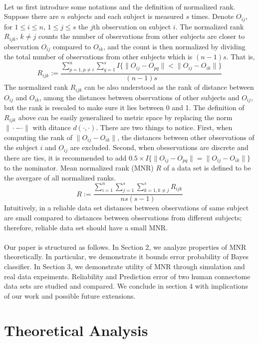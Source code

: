 \documentclass{article}
\begin{document}
\\
Let us first introduce some notations and the definition of normalized rank. Suppose there are $n$ subjects and each subject is measured $s$ times. Denote $O_{ij}$, for $1\leq i \leq n$, $1\leq j \leq s$ the $j$th observation on subject $i$. The normalized rank $R_{ijk}$, $k\neq j$ counts the number of observations from other subjects are closer to observation $O_{ij}$ compared to $O_{ik}$, and the count is then normalized by dividing the total number of observations from other subjects which is $(n-1)s$. That is,
\[R_{ijk} := \frac{\sum\limits_{p=1,p\neq i}^{n} \sum\limits_{q=1}^{s} I\{\|O_{ij}-O_{pq}\| < \|O_{ij}-O_{ik}\| \} }{(n-1)s}\]
 The normalized rank $R_{ijk}$ can be also understood as the rank of distance between $O_{ij}$ and $O_{ik}$, among the distances between observations of other subjects and $O_{ij}$, but the rank is rescaled to make sure it lies between 0 and 1. The definition of $R_{ijk}$ above can be easily generalized to metric space by replacing the norm $\|\cdot-\cdot\|$ with ditance $d(\cdot,\cdot)$. There are two things to notice. First, when computing the rank of $\|O_{ij}-O_{ik}\|$, the distances between other observations of the subject $i$ and $O_{ij}$ are excluded. Second, when obeservations are discrete and there are ties, it is recommended to add $0.5 \times I\{\|O_{ij}-O_{pq}\| = \|O_{ij}-O_{ik}\| \}$ to the nominator. Mean normalized rank (MNR) $R$ of a data set is defined to be the avergare of all normalized ranks. 
\[ R := \frac{\sum\limits_{i=1}^{n} \sum\limits_{j=1}^{s}  \sum\limits_{k=1,k\neq j}^{s} R_{ijk}}{ns(s-1)} \]
Intuitively, in a reliable data set distances between observations of same subject are small compared to distances between observations from different subjects; therefore, reliable data set should have a small MNR. \\
\\
Our paper is structured as follows. In Section 2, we analyze properties of MNR theoretically. In particular, we demonstrate it bounds error probability of Bayes classifier. In Section 3, we demonstrate utility of MNR through simulation and real data expeiments. Reliability and Prediction error of two human connectome data sets are studied and compared. We conclude in section 4 with implications of our work and possible future extensions.



\section{Theoretical Analysis}
\end{document}
